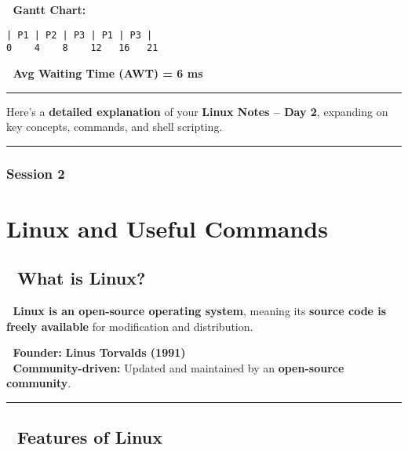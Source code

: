 \documentclass[
]{article}
\begin{document}
📌 \textbf{Gantt Chart:}

\begin{verbatim}
| P1 | P2 | P3 | P1 | P3 |
0    4    8    12   16   21
\end{verbatim}

📌 \textbf{Avg Waiting Time (AWT) = 6 ms}

\begin{center}\rule{0.5\linewidth}{0.5pt}\end{center}

Here's a \textbf{detailed explanation} of your \textbf{Linux Notes --
Day 2}, expanding on key concepts, commands, and shell scripting.

\begin{center}\rule{0.5\linewidth}{0.5pt}\end{center}

\subsubsection{Session 2}\label{session-2}

\section{\texorpdfstring{\textbf{Linux and Useful
Commands}}{Linux and Useful Commands}}\label{linux-and-useful-commands}

\subsection{\texorpdfstring{\textbf{📌 What is
Linux?}}{📌 What is Linux?}}\label{what-is-linux-1}

📌 \textbf{Linux is an open-source operating system}, meaning its
\textbf{source code is freely available} for modification and
distribution.

🔹 \textbf{Founder:} \textbf{Linus Torvalds (1991)}\\
🔹 \textbf{Community-driven:} Updated and maintained by an
\textbf{open-source community}.

\begin{center}\rule{0.5\linewidth}{0.5pt}\end{center}

\subsection{\texorpdfstring{\textbf{📌 Features of
Linux}}{📌 Features of Linux}}\label{features-of-linux-1}
\end{document}
